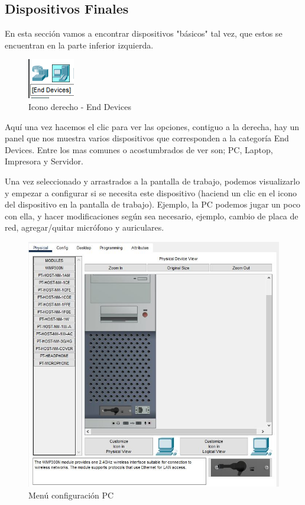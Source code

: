 \documentclass{article}
\begin{document}
\subsection{Dispositivos Finales}
En esta sección vamos a encontrar dispositivos "básicos" tal vez, que estos se encuentran en la parte inferior izquierda.
\begin{figure}[H]
    \centering
    \includegraphics[width=0.15\linewidth]{end devices.PNG}
    \caption{Icono derecho - End Devices}
    \label{fig:enter-label}
\end{figure}

Aquí una vez hacemos el clic para ver las opciones, contiguo a la derecha, hay un panel que nos muestra varios dispositivos que corresponden a la categoría End Devices. Entre los mas comunes o acostumbrados de ver son; PC, Laptop, Impresora y Servidor.

Una vez seleccionado y arrastrados a la pantalla de trabajo, podemos visualizarlo y empezar a configurar si se necesita este dispositivo (haciend un clic en el icono del dispositivo en la pantalla de trabajo).
Ejemplo, la PC podemos jugar un poco con ella, y hacer modificaciones según sea necesario, ejemplo, cambio de placa de red, agregar/quitar micrófono y auriculares.
\begin{figure}[H]
    \centering
    \includegraphics[width=0.70\linewidth]{Captura.JPG}
    \caption{Menú configuración PC}
\end{figure}
\end{document}
